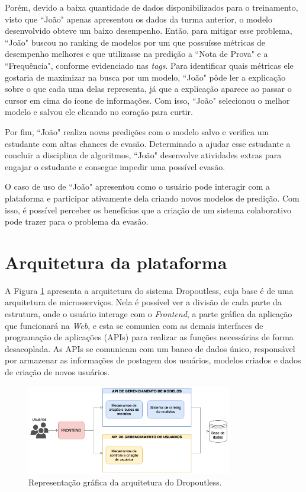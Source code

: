 \documentclass[12pt]{article}
\begin{document}
Porém, devido a baixa quantidade de dados disponibilizados para o treinamento, visto que ``João" apenas apresentou os dados da turma anterior, o modelo desenvolvido obteve um baixo desempenho. Então, para mitigar esse problema, ``João" buscou no ranking de modelos por um que possuísse métricas de desempenho melhores e que utilizasse na predição a ``Nota de Prova" e a ``Frequência", conforme evidenciado nas \textit{tags}. Para identificar quais métricas ele gostaria de maximizar na busca por um modelo, ``João" pôde ler a explicação sobre o que cada uma delas representa, já que a explicação aparece ao passar o cursor em cima do ícone de informações. Com isso, ``João" selecionou o melhor modelo e salvou ele clicando no coração para curtir. 

Por fim, ``João" realiza novas predições com o modelo salvo e verifica um estudante com altas chances de evasão. Determinado a ajudar esse estudante a concluir a disciplina de algoritmos, ``João" desenvolve atividades extras para engajar o estudante e consegue impedir uma possível evasão.

O caso de uso de ``João" apresentou como o usuário pode interagir com a plataforma e participar ativamente dela criando novos modelos de predição. Com isso, é possível perceber os benefícios que a criação de um sistema colaborativo pode trazer para o problema da evasão.

\section{Arquitetura da plataforma}
\label{sec:Arquitetura da plataforma}

A Figura \ref{fig:arquitetura} apresenta a arquitetura do sistema Dropoutless, cuja base é de uma arquitetura de microsserviços. Nela é possível ver a divisão de cada parte da estrutura, onde o usuário interage com o \textit{Frontend}, a parte gráfica da aplicação que funcionará na \textit{Web}, e esta se comunica com as demais interfaces de programação de aplicações (APIs) para realizar as funções necessárias de forma desacoplada. As APIs se comunicam com um banco de dados único, responsável por armazenar as informações de postagem dos usuários, modelos criados e dados de criação de novos usuários.

\begin{figure}[ht]
\centering
\includegraphics[width=0.8\textwidth]{images/arquitetura.png}
\caption{Representação gráfica da arquitetura do Dropoutless.}
\label{fig:arquitetura}
\end{figure}
\end{document}
